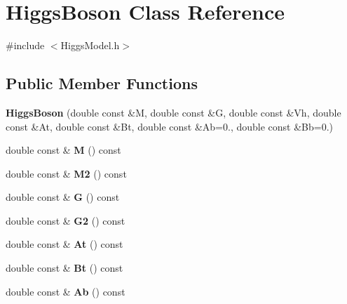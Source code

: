 \hypertarget{classHiggsBoson}{}\section{Higgs\+Boson Class Reference}
\label{classHiggsBoson}


{\ttfamily \#include $<$Higgs\+Model.\+h$>$}

\subsection*{Public Member Functions}
\begin{DoxyCompactItemize}
\item 
\hypertarget{classHiggsBoson_aef7e66e7df2850281117c8065f86266a}{}{\bfseries Higgs\+Boson} (double const \&M, double const \&G, double const \&Vh, double const \&At, double const \&Bt, double const \&Ab=0., double const \&Bb=0.)\label{classHiggsBoson_aef7e66e7df2850281117c8065f86266a}

\item 
\hypertarget{classHiggsBoson_a3a18ef5458760d0b4fe6f7f67847f200}{}double const \& {\bfseries M} () const \label{classHiggsBoson_a3a18ef5458760d0b4fe6f7f67847f200}

\item 
\hypertarget{classHiggsBoson_a1cbc3cabab562910857fd24602c88029}{}double const \& {\bfseries M2} () const \label{classHiggsBoson_a1cbc3cabab562910857fd24602c88029}

\item 
\hypertarget{classHiggsBoson_abee4eef942de0a4088166fa59b09054e}{}double const \& {\bfseries G} () const \label{classHiggsBoson_abee4eef942de0a4088166fa59b09054e}

\item 
\hypertarget{classHiggsBoson_aee7be204e7532152c97f6115632c76ac}{}double const \& {\bfseries G2} () const \label{classHiggsBoson_aee7be204e7532152c97f6115632c76ac}

\item 
\hypertarget{classHiggsBoson_a56fe580ffe65572242ba5170c5f95126}{}double const \& {\bfseries At} () const \label{classHiggsBoson_a56fe580ffe65572242ba5170c5f95126}

\item 
\hypertarget{classHiggsBoson_a0919c5fc894bb010490229271e781bdd}{}double const \& {\bfseries Bt} () const \label{classHiggsBoson_a0919c5fc894bb010490229271e781bdd}

\item 
\hypertarget{classHiggsBoson_a15a4d40ec981360f0c1033d5c7156c99}{}double const \& {\bfseries Ab} () const \label{classHiggsBoson_a15a4d40ec981360f0c1033d5c7156c99}


\end{DoxyCompactItemize}
